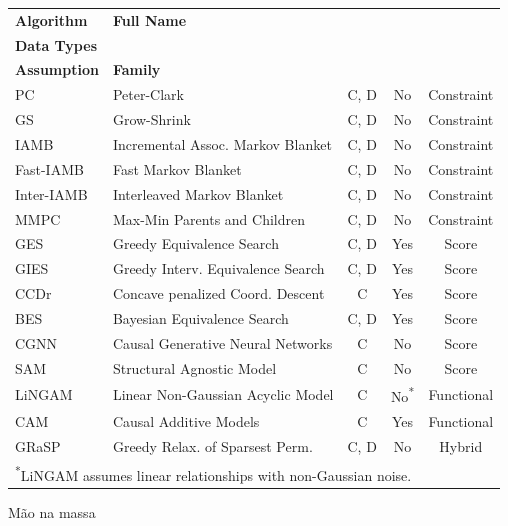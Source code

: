 \begin{frame}[plain]
    \begin{table}[htbp]
    \centering
    \label{tab:discovery_algorithms}
    \footnotesize
    \begin{tabular}{llccc}
    \toprule
    \textbf{Algorithm} & \textbf{Full Name} & \makecell{\textbf{Supported} \\ \textbf{Data Types}} & \makecell{\textbf{Gaussian} \\ \textbf{Assumption}} & \textbf{Family} \\
    \midrule
    PC \cite{discovery-pc} & Peter-Clark & C, D & No & Constraint \\
    GS \cite{discovery-gs} & Grow-Shrink & C, D & No & Constraint \\
    IAMB \cite{discovery-iamb} & Incremental Assoc. Markov Blanket & C, D & No & Constraint \\
    Fast-IAMB \cite{discovery-iamb-variants} & Fast Markov Blanket & C, D & No & Constraint \\
    Inter-IAMB \cite{discovery-iamb-variants} & Interleaved Markov Blanket & C, D & No & Constraint \\
    MMPC \cite{discovery-mmpc} & Max-Min Parents and Children & C, D & No & Constraint \\
    \midrule
    GES \cite{discovery-ges} & Greedy Equivalence Search & C, D & Yes & Score \\
    GIES \cite{discovery-ges_gies} & Greedy Interv. Equivalence Search & C, D & Yes & Score \\
    CCDr \cite{discovery-ccdr} & Concave penalized Coord. Descent & C & Yes & Score \\
    BES \cite{discovery-bes} & Bayesian Equivalence Search & C, D & Yes & Score \\
    CGNN \cite{discovery-cgnn} & Causal Generative Neural Networks & C & No & Score \\
    SAM \cite{discovery-sam} & Structural Agnostic Model & C & No & Score \\
    \midrule
    LiNGAM \cite{discovery-lingam} & Linear Non-Gaussian Acyclic Model & C & No\textsuperscript{*} & Functional \\
    CAM \cite{discovery-cam} & Causal Additive Models & C & Yes & Functional \\
    \midrule
    GRaSP \cite{discovery-grasp} & Greedy Relax. of Sparsest Perm. & C, D & No & Hybrid \\
    \bottomrule
    \multicolumn{5}{l}{\scriptsize \textsuperscript{*}LiNGAM assumes linear relationships with non-Gaussian noise.}
    \end{tabular}
    \end{table}
\end{frame}

\begin{frame}{Mão na massa}
\end{frame}
